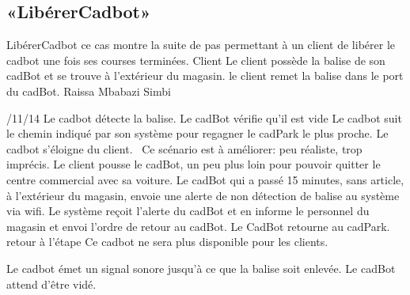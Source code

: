 \subsection{«LibérerCadbot»}
\startCU
\nom LibérerCadbot
\but ce cas montre la suite de pas permettant à un client de libérer le cadbot une fois ses courses terminées.
\acteur Client
\precondition Le client possède la balise de son cadBot et se trouve à l'extérieur du magasin.
\declenchement le client remet la balise dans le port du cadBot.
\auteur Raissa Mbabazi Simbi
\date 7/11/14
\nominal %
\startnominal
\etape[LC:SA2] Le cadbot détecte la balise.
\etape[LC:VIDE] Le cadBot vérifie qu'il est vide
\etape[LC:RETOUR] Le cadbot suit le chemin indiqué par son système pour regagner le cadPark le plus proche.
\stopnominal
\postcondition Le cadbot s'éloigne du client.
\alternatifs
\TODO\ Ce scénario est à améliorer: peu réaliste, trop imprécis.
\startalternatif[LC:SA2] %
\etape Le client pousse le cadBot, un peu plus loin pour pouvoir quitter le centre commercial avec sa voiture.
\etape Le cadBot qui a passé 15 minutes, sans article, à l'extérieur du magasin, envoie une alerte de non détection de balise au système via wifi.
\etape Le système reçoit l'alerte du cadBot et en informe le personnel du magasin et envoi l'ordre de retour au cadBot.
\etape Le CadBot retourne au cadPark.
\etape retour à l'étape \in[LC:RETOUR]
\stopcondition
\postcondition Ce cadbot ne sera plus disponible pour les clients.
\stopalternatif




\exception

\startalternatif[LC:VIDE] %
\etape Le cadbot émet un signal sonore jusqu'à ce que la balise soit enlevée.
\stopcondition
\postcondition Le cadBot attend d'être vidé.
\stopalternatif

\stopCU
